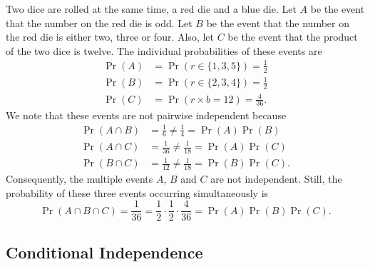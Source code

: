 \begin{example}
Two dice are rolled at the same time, a red die and a blue die.
Let $A$ be the event that the number on the red die is odd.
Let $B$ be the event that the number on the red die is either two, three or four.
Also, let $C$ be the event that the product of the two dice is twelve.
The individual probabilities of these events are
\begin{align*}
\Pr (A) &= \Pr (r \in \{1, 3, 5\}) = \frac{1}{2} \\
\Pr (B) &= \Pr (r \in \{2, 3, 4\}) = \frac{1}{2} \\
\Pr (C) &= \Pr (r \times b = 12) = \frac{4}{36} .
\end{align*}
We note that these events are not pairwise independent because
\begin{align*}
\Pr (A \cap B) &= \frac{1}{6} \neq \frac{1}{4} = \Pr(A) \Pr(B) \\
\Pr (A \cap C) &= \frac{1}{36} \neq \frac{1}{18} = \Pr(A) \Pr(C) \\
\Pr (B \cap C) &= \frac{1}{12} \neq \frac{1}{18} = \Pr(B) \Pr(C) .
\end{align*}
Consequently, the multiple events $A$, $B$ and $C$ are not independent.
Still, the probability of these three events occurring simultaneously is
\begin{equation*}
\Pr (A \cap B \cap C) = \frac{1}{36}
= \frac{1}{2} \cdot \frac{1}{2} \cdot \frac{4}{36}
= \Pr (A) \Pr (B) \Pr (C) .
\end{equation*}
\end{example}

\subsection{Conditional Independence}


